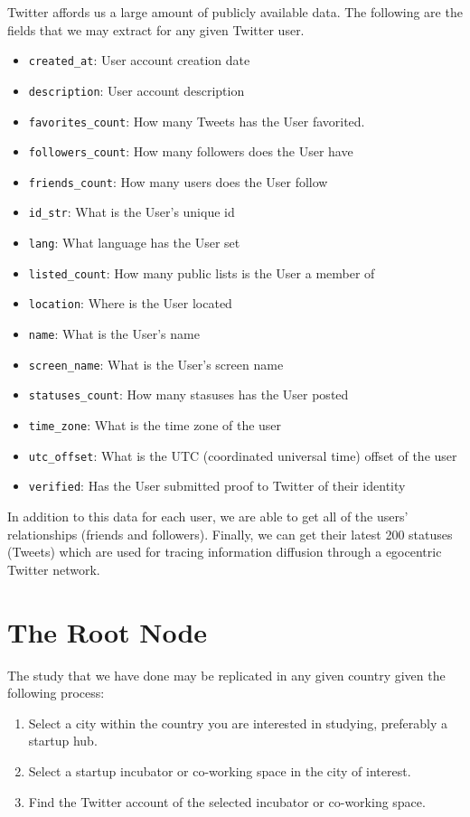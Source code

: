 Twitter affords us a large amount of publicly available data. The
following are the fields that we may extract for any given Twitter
user.

\begin{itemize}
\item \verb|created_at|: User account creation date
\item \verb|description|: User account description
\item \verb|favorites_count|: How many Tweets has the User favorited.
\item \verb|followers_count|: How many followers does the User have
\item \verb|friends_count|: How many users does the User follow
\item \verb|id_str|: What is the User's unique id
\item \verb|lang|: What language has the User set
\item \verb|listed_count|: How many public lists is the User a member of
\item \verb|location|: Where is the User located
\item \verb|name|: What is the User's name
\item \verb|screen_name|: What is the User's screen name
\item \verb|statuses_count|: How many stasuses has the User posted
\item \verb|time_zone|: What is the time zone of the user
\item \verb|utc_offset|: What is the UTC (coordinated universal time) offset of the user
\item \verb|verified|: Has the User submitted proof to Twitter of their identity
\end{itemize}

In addition to this data for each user, we are able to get all of the
users' relationships (friends and followers). Finally, we can get
their latest 200 statuses (Tweets) which are used for tracing
information diffusion through a egocentric Twitter network.

\section{The Root Node}
The study that we have done may be replicated in any given country
given the following process:

\begin{enumerate}
\item Select a city within the country you are interested in studying,
  preferably a startup hub.
\item Select a startup incubator or co-working space in the city of
  interest.
\item Find the Twitter account of the selected incubator or co-working
  space.
\end{enumerate}

